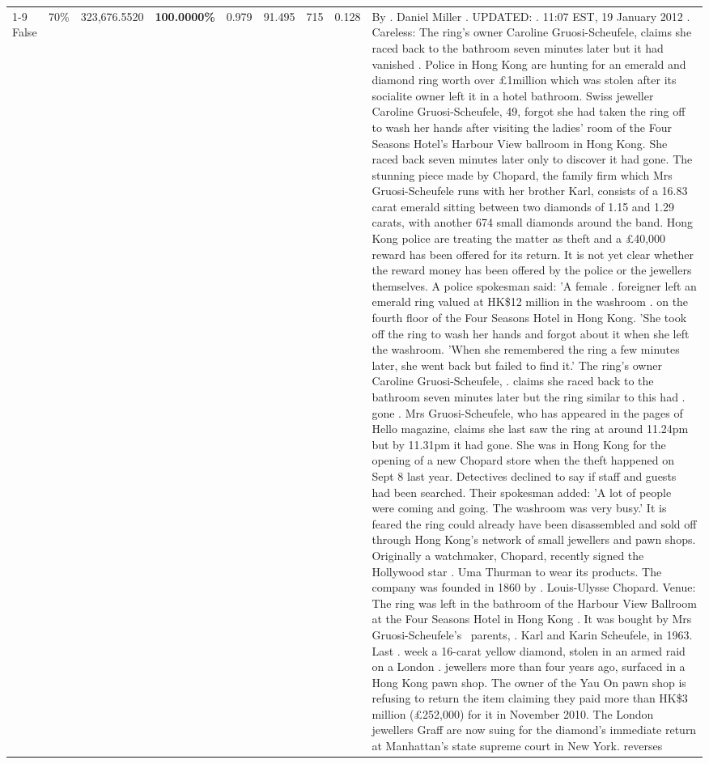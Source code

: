 \begin{table}[H]
\begin{tabular}{lllrlllll}
\cline{1-9} \cline{2-9}
False & 70\% & 323,676.5520 & \bfseries \color{red} 100.0000\% & 0.979 & 91.495 & 715 & 0.128 & By . Daniel Miller . UPDATED: . 11:07 EST, 19 January 2012 . Careless: The ring's owner Caroline Gruosi-Scheufele, claims she raced back to the bathroom seven minutes later but it had vanished . Police in Hong Kong are hunting for an emerald and diamond ring worth over £1million which was stolen after its socialite owner left it in a hotel bathroom. Swiss jeweller Caroline Gruosi-Scheufele, 49, forgot she had taken the ring off to wash her hands after visiting the ladies' room of the Four Seasons Hotel's Harbour View ballroom in Hong Kong. She raced back seven minutes later only to discover it had gone. The stunning piece made by Chopard, the family firm which Mrs Gruosi-Scheufele runs with her brother Karl, consists of a 16.83 carat emerald sitting between two diamonds of 1.15 and 1.29 carats, with another 674 small diamonds around the band. Hong Kong police are treating the matter as theft and a £40,000 reward has been offered for its return. It is not yet clear whether the reward money has been offered by the police or the jewellers themselves. A police spokesman said: 'A female . foreigner left an emerald ring valued at HK\$12 million in the washroom . on the fourth floor of the Four Seasons Hotel in Hong Kong. 'She took off the ring to wash her hands and forgot about it when she left the washroom. 'When she remembered the ring a few minutes later, she went back but failed to find it.' The ring's owner Caroline Gruosi-Scheufele, . claims she raced back to the bathroom seven minutes later but the ring similar to this had . gone . Mrs Gruosi-Scheufele, who has appeared in the pages of Hello magazine, claims she last saw the ring at around 11.24pm but by 11.31pm it had gone. She was in Hong Kong for the opening of a new Chopard store when the theft happened on Sept 8 last year. Detectives declined to say if staff and guests had been searched. Their spokesman added: 'A lot of people were coming and going. The washroom was very busy.' It is feared the ring could already have been disassembled and sold off through Hong Kong's network of small jewellers and pawn shops. Originally a watchmaker, Chopard, recently signed the Hollywood star . Uma Thurman to wear its products. The company was founded in 1860 by . Louis-Ulysse Chopard. Venue: The ring was left in the bathroom of the Harbour View Ballroom at the Four Seasons Hotel in Hong Kong . It was bought by Mrs Gruosi-Scheufele's  parents, . Karl and Karin Scheufele, in 1963. Last . week a 16-carat yellow diamond, stolen in an armed raid on a London . jewellers more than four years ago, surfaced in a Hong Kong pawn shop. The owner of the Yau On pawn shop is refusing to return the item claiming they paid more than HK\$3 million (£252,000) for it in November 2010. The London jewellers Graff are now suing for the diamond’s immediate return at Manhattan’s state supreme court in New York. reverses \\

\end{tabular}
\end{table}
